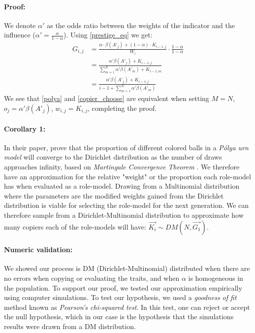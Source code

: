 \documentclass[11pt]{article}
\begin{document}
\paragraph{Proof:} 
We denote $\alpha'$ as the odds ratio between the weights of the indicator and the influence ($\alpha'=\frac{\alpha}{1-\alpha}$). 
Using \cref{prestige_eq} we get:
\begin{equation}\label{copier_choose}
\begin{split}
G_{i,j} & = \frac{\alpha\cdot \beta(A'_j) + (1-\alpha) \cdot K_{i-1,j}}{W_i} \cdot \frac{1-\alpha}{1-\alpha} \\
&= \frac{\alpha'\beta(A'_j) + K_{i-1,j}}{\sum\limits_{m=1}^{N} \alpha'\beta(A'_m) + K_{i-1,m}}\\
& =\frac{\alpha'\beta(A'_j) + K_{i-1,j}}{i-1 + \sum\limits_{m=1}^{N} \alpha'\beta(A'_m)}
\end{split}
\end{equation}
We see that \cref{polya} and \cref{copier_choose} are equivalent when setting $M=N$, $o_j = \alpha'\beta(A'_j)$, $w_{i,j} = K_{i,j}$, completing the proof.

\paragraph{Corollary 1:}
In their paper, \citet[section 2]{dirichlet} prove that the proportion of different colored balls in a \textit{Pólya urn model} will converge to the Dirichlet distribution as the number of draws approaches infinity, based on \textit{Martingale Convergence Theorem} \citep{martingaleBook}.
We therefore have an approximation for the relative "weight" or the proportion each role-model has when evaluated as a role-model. Drawing from a Multinomial distribution where the parameters are the modified weights gained from the Dirichlet distribution is viable for selecting the role-model for the next generation.
We can therefore sample from a Dirichlet-Multinomial distribution to approximate how many copiers each of the role-models will have:
$\vec{K_i} \sim DM(N,\vec{G_1})$.

\paragraph{Numeric validation:} We showed our process is DM (Dirichlet-Multinomial) distributed when there are no errors when copying or evaluating the traits, and when $\alpha$ is homogeneous in the population. To support our proof, we tested our approximation empirically using computer simulations.
To test our hypothesis, we used a \textit{goodness of fit} method known as \textit{Pearson's chi-squared test}. In this test, one can reject or accept the null hypothesis, which in our case is the hypothesis that the simulations results were drawn from a DM distribution.
\end{document}
